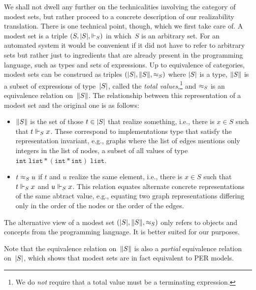 We shall not dwell any further on the technicalities involving the
category of modest sets, but rather proceed to a concrete description
of our realizability translation. There is one technical point,
though, which we first take care of. A modest set is a triple $(S,
|S|, {\Vdash_S})$ in which~$S$ is an arbitrary set. For an automated
system it would be convenient if it did not have to refer to arbitrary
sets but rather just to ingredients that are already present in the
programming language, such as types and sets of expressions. Up to
equivalence of categories, modest sets can be construed as triples
$(|S|, \|S\|, {\approx_{S}})$ where $|S|$ is a type, $\|S\|$ is
a subset of expressions of type~$|S|$, called the \emph{total
  values},\footnote{We do \emph{not} require that a total value must
  be a terminating expression.} and $\approx_{S}$ is an equivalence
relation on~$\|S\|$. The relationship between this representation of
a modest set and the original one is as follows:
%
\begin{itemize}
\item $\|S\|$ is the set of those $t \in |S|$ that
  realize something, i.e., there is $x \in S$ such that $t \Vdash_S x$.
  These correspond to implementations type that satisfy
  the representation invariant, e.g., graphs where the list of edges
  mentions only integers in the list of nodes, a subset of
  all values of type $\mathtt{int} \; \mathtt{list} * (\mathtt{int} *
\mathtt{int}) \; \mathtt{list}$.
\item $t \approx_{S} u$ if $t$ and $u$ realize the same element, i.e.,
  there is $x \in S$ such that $t \Vdash_S x$ and $u \Vdash_S x$.
  This relation equates alternate concrete representations of the same
  abtract value, e.g., equating two graph representations differing
  only in the order of the nodes or the order of the edges.
\end{itemize}
%
The alternative view of a modest set $(|S|, \|S\|, {\approx_{S}})$
only refers to objects and concepts from the programming language. It
is better suited for our purposes.

Note that the equivalence relation on~$\|S\|$ is also a
\emph{partial} equivalence relation on~$|S|$, which shows that
modest sets are in fact equivalent to PER models.


